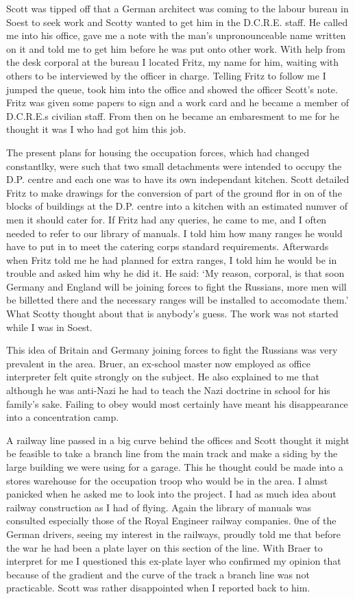 \Captain Scott was tipped off that a German architect was coming to the
labour bureau in Soest to seek work and Scotty wanted to get him in
the D.C.R.E. staff. He called me into his office, gave me a note with
the man's unpronounceable name written on it and told me to get him
before he was put onto other work. With help from the desk corporal at
the bureau I located Fritz, my name for him, waiting with others to be
interviewed by the officer in charge. Telling Fritz to follow me I
jumped the queue, took him into the office and showed the officer
\captain Scott's note. Fritz was given some papers to sign and a work
card and he became a member of D.C.R.E.s civilian staff. From then on
he became an embaresment to me for he thought it was I who had got him
this job.

The present plans for housing the occupation forces, which had changed
constantlky, were such that two small detachments were intended to
occupy the D.P. centre and each one was to have its own independant
kitchen. \Captain Scott detailed Fritz to make drawings for the
conversion of part of the ground flor in on of the blocks of buildings
at the D.P. centre into a kitchen with an estimated numver of men it
should cater for. If Fritz had any queries, he came to me, and I often
needed to refer to our library of manuals. I told him how many ranges
he would have to put in to meet the catering corps standard
requirements. Afterwards when Fritz told me he had planned for extra
ranges, I told him he would be in trouble and asked him why he did
it. He said: `My reason, corporal, is that soon Germany and England will
be joining forces to fight the Russians, more men will be billetted
there and the necessary ranges will be installed to accomodate them.'
What Scotty thought about that is anybody's guess. The work was not
started while I was in Soest.

This idea of Britain and Germany joining forces to fight the Russians
was very prevalent in the area. Bruer, an ex-school master now
employed as office interpreter felt quite strongly on the subject. He
also explained to me that although he was anti-Nazi he had to teach
the Nazi doctrine in school for his family's sake. Failing to obey
would most certainly have meant his disappearance into a concentration
camp.

A railway line passed in a big curve behind the offices and \captain
Scott thought it might be feasible to take a branch line from the main
track and make a siding by the large building we were using for a
garage. This he thought could be made into a stores warehouse for the
occupation troop who would be in the area. I almst panicked when he
asked me to look into the project. I had as much idea about railway
construction as I had of flying. Again the library of manuals was
consulted especially those of the Royal Engineer railway
companies. 0ne of the German drivers, seeing my interest in the
railways, proudly told me that before the war he had been a plate
layer on this section of the line. With Braer to interpret for me I
questioned this ex-plate layer who confirmed my opinion that because
of the gradient and the curve of the track a branch line was not
practicable. \Captain Scott was rather disappointed when I reported
back to him.

